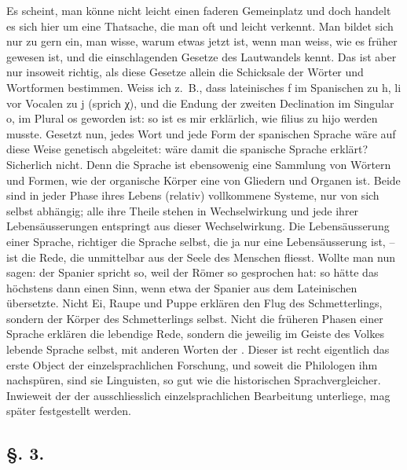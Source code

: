 Es scheint, man könne nicht leicht einen faderen Gemeinplatz  und doch handelt es sich hier um eine Thatsache, die man oft und leicht verkennt. Man bildet sich nur zu gern ein, man wisse, warum etwas jetzt ist, wenn man weiss, wie es früher gewesen ist, und die einschlagenden Gesetze des Lautwandels kennt. Das ist aber nur insoweit richtig, als diese Gesetze allein die Schicksale der Wörter und Wort\-\label{fp.10}formen bestimmen. Weiss ich z.~B., dass lateinisches f im Spanischen zu h, li vor Vocalen zu j (sprich χ), und die Endung der zweiten Declination im Singular o, im Plural os geworden ist: so ist es mir erklärlich, wie filius zu hijo werden musste. Gesetzt nun, jedes Wort und jede Form der spanischen Sprache wäre auf diese Weise genetisch abgeleitet: wäre damit die spanische Sprache erklärt? Sicherlich nicht. Denn die Sprache ist ebensowenig eine Sammlung von Wörtern und Formen, wie der \label{sp.9} organische Körper eine  von Gliedern und Organen ist. Beide sind in jeder Phase ihres Lebens (relativ) vollkommene Systeme, nur von sich selbst abhängig; alle ihre Theile stehen in Wechselwirkung und jede ihrer Lebensäusserungen entspringt aus dieser Wechselwirkung. Die Lebensäusserung einer Sprache, richtiger die Sprache selbst, die ja nur eine Lebensäusserung ist, – ist die Rede, die unmittelbar aus der Seele des Menschen fliesst. Wollte man nun sagen: der Spanier spricht so, weil der Römer so gesprochen hat: so hätte das höchstens dann einen Sinn, wenn etwa der Spanier aus dem Lateinischen übersetzte. Nicht Ei, Raupe und Puppe erklären den Flug des Schmetterlings, sondern der Körper des Schmetterlings selbst. Nicht die früheren Phasen einer Sprache erklären die lebendige Rede, sondern die jeweilig im Geiste des Volkes lebende Sprache selbst, mit anderen Worten der . Dieser ist recht eigentlich das erste Object der einzelsprachlichen Forschung, und soweit die Philologen ihm nachspüren, sind sie Linguisten, so gut wie die historischen Sprachvergleicher. Inwieweit der  der ausschliesslich einzelsprachlichen Bearbeitung unterliege, mag später festgestellt werden.

\clearpage{}
\subsection*{§. 3.}\label{I.II.3}
